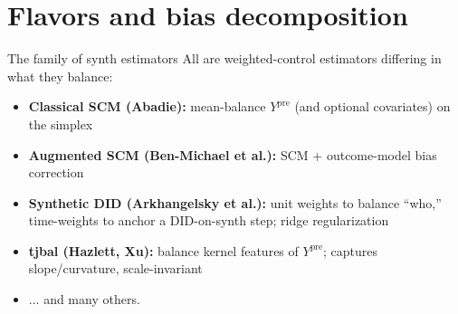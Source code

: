 \documentclass[handout,xcolor=dvipsnames,pdftex,hyperref={colorlinks=false}]{beamer}
\newcommand\makegaps{\addtolength{\itemsep}{.25\baselineskip}}
\newcommand{\Ypre}{Y^{\text{pre}}}        %
\begin{document}
\section{Flavors and bias decomposition}


\begin{frame}{The family of synth estimators}
  \small
All are weighted-control estimators differing in what they balance:
\smallskip
\begin{itemize}\makegaps
  \item<1-> \textbf{Classical SCM (Abadie):} mean-balance $\Ypre$ (and optional covariates) on the simplex
  \item<2-> \textbf{Augmented SCM (Ben-Michael et al.):} SCM + outcome-model bias correction
  \item<3-> \textbf{Synthetic DID (Arkhangelsky et al.):} unit weights to balance ``who,'' time-weights to anchor a DID-on-synth step; ridge regularization
  \item<4-> \textbf{tjbal (Hazlett, Xu):} balance kernel features of $\Ypre$; captures slope/curvature, scale-invariant
  \item<5-> ... and many others.
\end{itemize}
\bigskip
{}
\end{frame}
\end{document}
